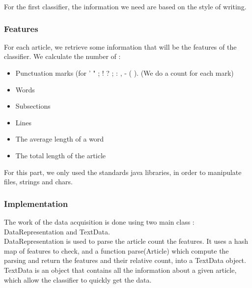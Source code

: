 For the first classifier, the information we need are based on the style of writing.

\subsubsection{Features}
\label{lab:data1}
For each article, we retrieve some information that will be the features of the classifier. We calculate the number of : 
\begin{itemize}
	\item Punctuation marks (for ' " ; ! ? ; : , - ( ). (We do a count for each mark)
	\item Words
	\item Subsections
	\item Lines
	\item The average length of a word
	\item The total length of the article
\end{itemize}

For this part, we only used the standards java libraries, in order to manipulate files, strings and chars. 

\subsubsection{Implementation}

The work of the data acquisition is done using two main class : DataRepresentation and TextData.\\
DataRepresentation is used to parse the article count the features. It uses a hash map of features to check, and a function parse(Article) which compute the parsing and return the features and their relative count, into a TextData object.\\
TextData is an object that contains all the information about a given article, which allow the classifier to quickly get the data. 

